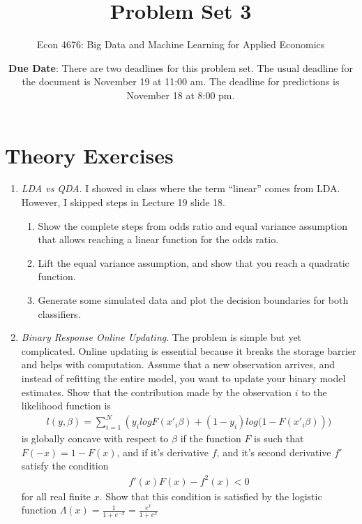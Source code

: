 \documentclass[12pt,onecolumn,A4]{article}
\title{Problem Set 3}
\subtitle{Econ 4676: Big Data and Machine Learning for Applied Economics}
\author{{\bf Due Date}: There are two deadlines for this problem set. The usual deadline for the document is November 19 at 11:00 am. The deadline for predictions is November 18 at 8:00 pm. }
\date{}
\begin{document}
\maketitle

\section{Theory Exercises}

\begin{enumerate}
  \item {\it LDA vs QDA}. I showed in class where the term ``linear'' comes from LDA. However, I skipped steps in Lecture 19 slide 18. 
  \begin{enumerate}
    \item Show the complete steps from odds ratio and equal variance assumption that allows reaching a linear function for the odds ratio. 
    \item Lift the equal variance assumption, and show that you reach a quadratic function. 
    \item Generate some simulated data and plot the decision boundaries for both classifiers. 
  \end{enumerate}
  \item {\it Binary Response Online Updating}. The problem is simple but yet complicated. Online updating is essential because it breaks the storage barrier and helps with computation. Assume that a new observation arrives, and instead of refitting the entire model, you want to update your binary model estimates. Show that the contribution made by the observation $i$ to the likelihood function is
\begin{align}
l(y,\beta) = \sum_{i=1}^N \left( y_i log F(x'_i\beta) + (1-y_i) log (1-F(x'_i\beta)  \right))
\end{align}
  is globally concave with respect to $\beta$ if the function $F$ is such that $F(-x)=1-F(x)$, and if it's derivative $f$, and it's second derivative $f'$ satisfy the condition
  \begin{align}
  f'(x)F(x)-f^2(x)<0
  \end{align}
  for all real finite $x$. Show that this condition is satisfied by the logistic function $\Lambda(x)=\frac{1}{1+e^{-x}}=\frac{e^{x}}{1+e^{x}}$


\end{enumerate}
\end{document}
